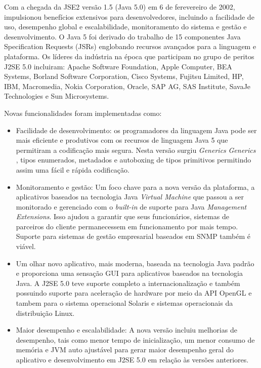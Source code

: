 Com a chegada da JSE2 versão 1.5 (Java 5.0) em 6 de ferevereiro de 2002, impulsionou benefícios extensivos para desenvolvedores, incluindo a facilidade de uso, desempenho global e escalabilidade, monitoramento do sistema e gestão e desenvolvimento. O Java 5 foi derivado do trabalho de 15 componentes Java Specification Requests (JSRs) englobando recursos avançados para a linguagem e plataforma. Os líderes da indústria na época que participam no grupo de peritos J2SE 5.0 incluiram: Apache Software Foundation, Apple Computer, BEA Systems, Borland Software Corporation, Cisco Systems, Fujitsu Limited, HP, IBM, Macromedia, Nokia Corporation, Oracle, SAP AG, SAS Institute, SavaJe Technologies e Sun Microsystems.

Novas funcionalidades foram implementadas como:

\begin{itemize}
  \item Facilidade de desenvolvimento: os programadores da linguagem Java pode ser mais eficiente e produtivos com os recursos de linguagem Java 5 que permitiram a codificação mais segura. Nesta versão surgiu {\it Generics} {\it Generics} \cite{OracleGenerics,Bracha:1998:MFS:286942.286957}, tipos enumerados, metadados e autoboxing de tipos primitivos permitindo assim uma fácil e rápida codificação.
  \item Monitoramento e gestão: Um foco chave para a nova versão da plataforma, a aplicativos baseados na tecnologia Java {\it Virtual Machine} que passou a ser monitorado e gerenciado com o {\it built-in} de suporte para Java {\it Management Extensions}. Isso ajudou a garantir que seus funcionários, sistemas de parceiros do cliente permanecessem em funcionamento por mais tempo. Suporte para sistemas de gestão empresarial baseados em SNMP também é viável.
  \item Um olhar novo aplicativo, mais moderna, baseada na tecnologia Java padrão e proporciona uma sensação GUI para aplicativos baseados na tecnologia Java. A J2SE 5.0 teve suporte completo a internacionalização e também possuindo suporte para aceleração de hardware por meio da API OpenGL e tambem para o sistema operacional Solaris e sistemas operacionais da distribuição Linux.
  \item Maior desempenho e escalabilidade: A nova versão incluiu melhorias de desempenho, tais como menor tempo de inicialização, um menor consumo de memória e JVM auto ajustável para gerar maior desempenho geral do aplicativo e desenvolvimento em J2SE 5.0 em relação às versões anteriores.\\
\end{itemize}

